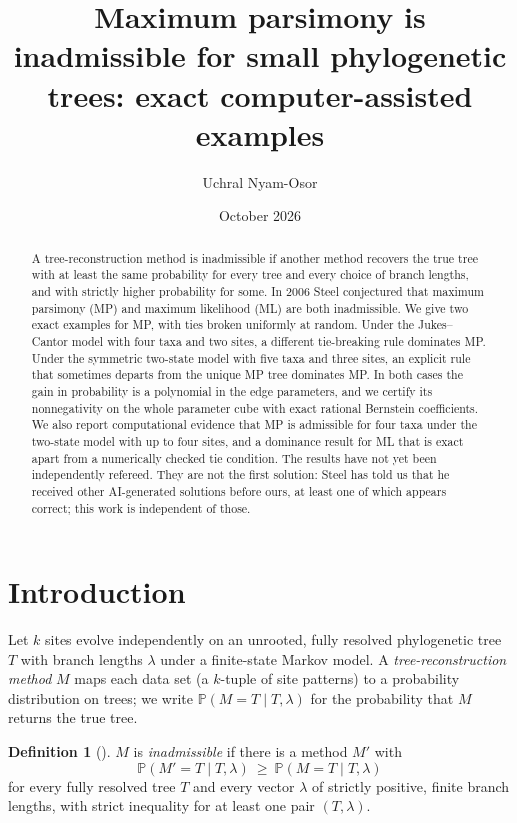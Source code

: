 \documentclass[11pt]{amsart}
\title[Maximum parsimony is inadmissible for small trees]{Maximum parsimony is inadmissible for small phylogenetic trees: exact computer-assisted examples}
\author{Uchral Nyam-Osor}
\date{October 2026}
\theoremstyle{definition}
\newtheorem{definition}[theorem]{Definition}
\theoremstyle{remark}
\newcommand{\Prob}{\mathbb{P}}
\begin{document}
\sloppy
\pagestyle{plain}

\begin{abstract}
A tree-reconstruction method is inadmissible if another method recovers the true tree with at least the same probability for every tree and every choice of branch lengths, and with strictly higher probability for some. In 2006 Steel conjectured that maximum parsimony (MP) and maximum likelihood (ML) are both inadmissible. We give two exact examples for MP, with ties broken uniformly at random. Under the Jukes--Cantor model with four taxa and two sites, a different tie-breaking rule dominates MP. Under the symmetric two-state model with five taxa and three sites, an explicit rule that sometimes departs from the unique MP tree dominates MP. In both cases the gain in probability is a polynomial in the edge parameters, and we certify its nonnegativity on the whole parameter cube with exact rational Bernstein coefficients. We also report computational evidence that MP is admissible for four taxa under the two-state model with up to four sites, and a dominance result for ML that is exact apart from a numerically checked tie condition. The results have not yet been independently refereed. They are not the first solution: Steel has told us that he received other AI-generated solutions before ours, at least one of which appears correct; this work is independent of those.
\end{abstract}

\maketitle

\section{Introduction}

Let $k$ sites evolve independently on an unrooted, fully resolved phylogenetic tree $T$ with branch lengths $\lambda$ under a finite-state Markov model. A \emph{tree-reconstruction method} $M$ maps each data set (a $k$-tuple of site patterns) to a probability distribution on trees; we write $\Prob(M=T\mid T,\lambda)$ for the probability that $M$ returns the true tree.

\begin{definition}[\cite{SteelConj}]
$M$ is \emph{inadmissible} if there is a method $M'$ with
\[
\Prob(M'=T\mid T,\lambda)\ \ge\ \Prob(M=T\mid T,\lambda)
\]
for every fully resolved tree $T$ and every vector $\lambda$ of strictly positive, finite branch lengths, with strict inequality for at least one pair $(T,\lambda)$.
\end{definition}
\end{document}
